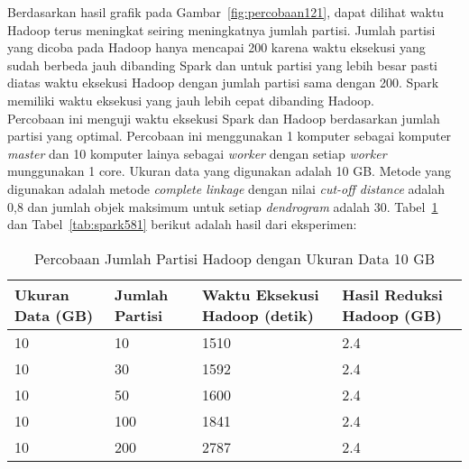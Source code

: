 Berdasarkan hasil grafik pada Gambar~\ref{fig:percobaan121}, dapat dilihat waktu Hadoop terus meningkat seiring meningkatnya jumlah partisi. Jumlah partisi yang dicoba pada Hadoop hanya mencapai 200 karena waktu eksekusi yang sudah berbeda jauh dibanding Spark dan untuk partisi yang lebih besar pasti diatas waktu eksekusi Hadoop dengan jumlah partisi sama dengan 200. Spark memiliki waktu eksekusi yang jauh lebih cepat dibanding Hadoop. \\



















Percobaan ini menguji waktu eksekusi Spark dan Hadoop berdasarkan jumlah partisi yang optimal. Percobaan ini menggunakan 1 komputer sebagai komputer \textit{master} dan 10 komputer lainya sebagai \textit{worker} dengan setiap \textit{worker} munggunakan 1 core. Ukuran data yang digunakan adalah 10 GB. Metode yang digunakan adalah metode \textit{complete linkage} dengan nilai \textit{cut-off distance} adalah 0,8 dan jumlah objek maksimum untuk setiap \textit{dendrogram} adalah 30. Tabel~\ref{tab:spark571} dan Tabel~\ref{tab:spark581} berikut adalah hasil dari eksperimen:


\begin{table}[H] 
	\centering 
	\caption{Percobaan Jumlah Partisi Hadoop dengan Ukuran Data 10 GB}
	\label{tab:spark571}
	\begin{tabular}{|p{3cm}|p{3cm}|p{4cm}|p{4cm}|}
\hline
Ukuran Data (GB) & Jumlah Partisi &  Waktu Eksekusi Hadoop (detik) & Hasil Reduksi Hadoop (GB)\\
\hline
10 & 10 & 1510  & 2.4  \\
\hline
10 & 30 & 1592  & 2.4  \\
\hline
10 & 50 & 1600  & 2.4  \\
\hline
10 & 100 & 1841  & 2.4  \\
\hline
10 & 200 & 2787  & 2.4  \\
\hline

\hline

	\end{tabular} 
\end{table}




